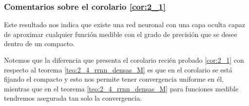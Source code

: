 \subsubsection{Comentarios sobre el corolario \ref{cor:2_1}}  

Este resultado nos indica que existe una red neuronal con una 
capa oculta capaz de aproximar cualquier función medible con el grado 
de precisión que se desee dentro de un compacto.   

Notemos que la diferencia que presenta el corolario recién probado
\ref{cor:2_1} con respecto al teorema \ref{teo:2_4_rrnn_densas_M}
es que en el corolario se está fijando el compacto y esto nos 
permite tener convergencia uniforme en él, mientras que en el 
teorema \ref{teo:2_4_rrnn_densas_M} para funciones medible
tendremos asegurada tan solo la convergencia. 
